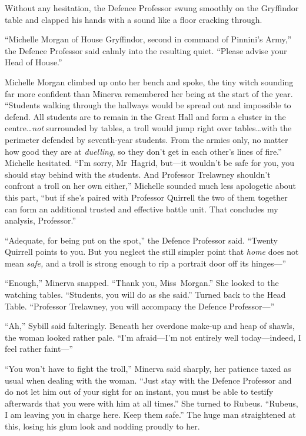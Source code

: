 Without any hesitation, the Defence Professor swung smoothly on the Gryffindor table and clapped his hands with a sound like a floor cracking through.

“Michelle Morgan of House Gryffindor, second in command of Pinnini’s Army,” the Defence Professor said calmly into the resulting quiet. “Please advise your Head of House.”

Michelle Morgan climbed up onto her bench and spoke, the tiny witch sounding far more confident than Minerva remembered her being at the start of the year. “Students walking through the hallways would be spread out and impossible to defend. All students are to remain in the Great Hall and form a cluster in the centre…\emph{not} surrounded by tables, a troll would jump right over tables…with the perimeter defended by seventh-year students. From the armies only, no matter how good they are at \emph{duelling,} so they don’t get in each other’s lines of fire.” Michelle hesitated. “I’m sorry, Mr~Hagrid, but—it wouldn’t be safe for you, you should stay behind with the students. And Professor Trelawney shouldn’t confront a troll on her own either,” Michelle sounded much less apologetic about this part, “but if she’s paired with Professor Quirrell the two of them together can form an additional trusted and effective battle unit. That concludes my analysis, Professor.”

“Adequate, for being put on the spot,” the Defence Professor said. “Twenty Quirrell points to you. But you neglect the still simpler point that \emph{home} does not mean \emph{safe,} and a troll is strong enough to rip a portrait door off its hinges—”

“Enough,” Minerva snapped. “Thank you, Miss~Morgan.” She looked to the watching tables. “Students, you will do as she said.” Turned back to the Head Table. “Professor Trelawney, you will accompany the Defence Professor—”

“Ah,” Sybill said falteringly. Beneath her overdone make-up and heap of shawls, the woman looked rather pale. “I’m afraid—I’m not entirely well today—indeed, I feel rather faint—”

“You won’t have to fight the troll,” Minerva said sharply, her patience taxed as usual when dealing with the woman. “Just stay with the Defence Professor and do not let him out of your sight for an instant, you must be able to testify afterwards that you were with him at all times.” She turned to Rubeus. “Rubeus, I am leaving you in charge here. Keep them safe.” The huge man straightened at this, losing his glum look and nodding proudly to her.

